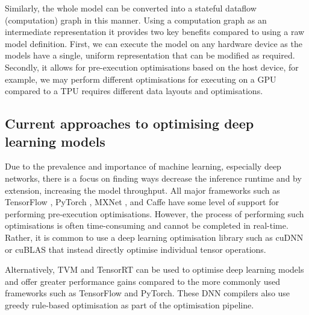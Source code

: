 Similarly, the whole model can be converted into a stateful dataflow (computation) graph in this manner. Using a computation graph as an intermediate representation it provides two key benefits compared to using a raw model definition. First, we can execute the model on any hardware device as the models have a single, uniform representation that can be modified as required. Secondly, it allows for pre-execution optimisations based on the host device, for example, we may perform different optimisations for executing on a GPU compared to a TPU requires different data layouts and optimisations.

\subsection{Current approaches to optimising deep learning models}
\label{sec:bg:subsec:currentapp}

Due to the prevalence and importance of machine learning, especially deep networks, there is a focus on finding ways decrease the inference runtime and by extension, increasing the model throughput. All major frameworks such as TensorFlow \cite{tensorflow2015-whitepaper}, PyTorch \cite{pytorch}, MXNet \cite{chen2015mxnet}, and Caffe \cite{jia2014caffe} have some level of support for performing pre-execution optimisations. However, the process of performing such optimisations is often time-consuming and cannot be completed in real-time. Rather, it is common to use a deep learning optimisation library such as cuDNN \cite{chetlur2014cudnn} or cuBLAS \cite{cublas2008} that instead directly optimise individual tensor operations.



Alternatively, TVM \cite{chen2018tvm} and TensorRT \cite{tensorrt2017} can be used to optimise deep learning models and offer greater performance gains compared to the more commonly used frameworks such as TensorFlow and PyTorch. These DNN compilers also use greedy rule-based optimisation as part of the optimisation pipeline.


